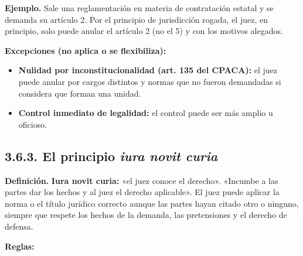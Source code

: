 \begin{ejemplo}
\textcolor[HTML]{4F6228}{\textbf{Ejemplo. }}Sale una reglamentación en materia de contratación estatal y se demanda su artículo 2. Por el principio de jurisdicción rogada, el juez, en principio, solo puede anular el artículo 2 (no el 5) y con los motivos alegados.
\end{ejemplo}
\textbf{Excepciones (no aplica o se flexibiliza):}

\begin{itemize}
\item \textbf{Nulidad por inconstitucionalidad (art. 135 del CPACA):} el juez puede anular por cargos distintos y normas que no fueron demandadas si considera que forman una unidad.
\item \textbf{Control inmediato de legalidad:} el control puede ser más amplio u oficioso.
\end{itemize}
\subsection{3.6.3. El principio \textit{iura novit curia}}
\begin{definicion}
\textcolor[HTML]{1F3864}{\textbf{Definición. }}\textbf{Iura novit curia: }«el juez conoce el derecho». «Incumbe a las partes dar los hechos y al juez el derecho aplicable». El juez puede aplicar la norma o el título jurídico correcto aunque las partes hayan citado otro o ninguno, siempre que respete los hechos de la demanda, las pretensiones y el derecho de defensa.
\end{definicion}
\textbf{Reglas:}

